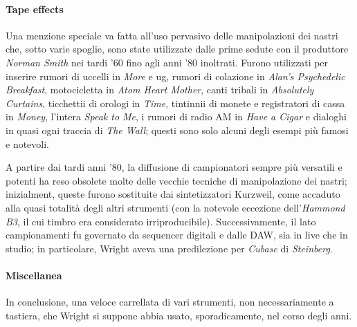 \documentclass[class=book, crop=false, oneside, 12pt]{standalone}
\begin{document}
    \paragraph{Tape effects}
    Una menzione speciale va fatta all'uso pervasivo delle manipolazioni dei nastri che, sotto varie spoglie, sono state utilizzate dalle prime sedute con il produttore \emph{Norman Smith} nei tardi '60 fino agli anni '80 inoltrati. Furono utilizzati per inserire rumori di uccelli in \emph{More} e \acrshort{ug}, rumori di colazione in \emph{Alan's Psychedelic Breakfast}, motocicletta in \emph{Atom Heart Mother}, canti tribali in \emph{Absolutely Curtains}, ticchettii di orologi in \emph{Time}, tintinnii di monete e registratori di cassa in \emph{Money}, l'intera \emph{Speak to Me}, i rumori di radio AM in \emph{Have a Cigar} e dialoghi in quasi ogni traccia di \emph{The Wall}; questi sono solo alcuni degli esempi più famosi e notevoli. 
    
    A partire dai tardi anni '80, la diffusione di campionatori sempre più versatili e potenti ha reso obsolete molte delle vecchie tecniche di manipolazione dei nastri; inizialment, queste furono sostituite dai sintetizzatori Kurzweil, come accaduto alla quasi totalità degli altri strumenti (con la notevole eccezione dell'\emph{Hammond B3}, il cui timbro era considerato irriproducibile). Successivamente, il lato campionamenti fu governato da sequencer digitali e dalle DAW, sia in live che in studio; in particolare, Wright aveva una predilezione per \emph{Cubase} di \emph{Steinberg}.
    
    \paragraph{Miscellanea} In conclusione, una veloce carrellata di vari strumenti, non necessariamente a tastiera, che Wright si suppone abbia usato, sporadicamente, nel corso degli anni.
\end{document}
